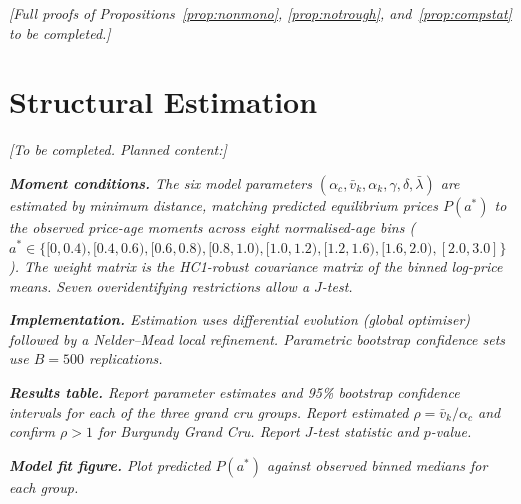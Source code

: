 \noindent\textit{[Full proofs of Propositions~\ref{prop:nonmono},
\ref{prop:notrough}, and~\ref{prop:compstat} to be completed.]}

\section{Structural Estimation}
\label{app:structural}

\noindent\textit{[To be completed. Planned content:]}

\noindent\textit{\textbf{Moment conditions.} The six model parameters
$(\alpha_{c}, \bar{v}_{k}, \alpha_{k}, \gamma, \delta, \bar{\lambda})$ are estimated by
minimum distance, matching predicted equilibrium prices $P(a^*)$ to the observed price-age
moments across eight normalised-age bins ($a^* \in \{[0,0.4), [0.4,0.6), [0.6,0.8),
[0.8,1.0), [1.0,1.2), [1.2,1.6), [1.6,2.0), [2.0,3.0]\}$). The weight matrix is the
HC1-robust covariance matrix of the binned log-price means. Seven overidentifying
restrictions allow a $J$-test.}

\noindent\textit{\textbf{Implementation.} Estimation uses differential evolution (global
optimiser) followed by a Nelder--Mead local refinement. Parametric bootstrap confidence
sets use $B = 500$ replications.}

\noindent\textit{\textbf{Results table.} Report parameter estimates and 95\% bootstrap
confidence intervals for each of the three grand cru groups. Report estimated $\rho =
\bar{v}_{k} / \alpha_{c}$ and confirm $\rho > 1$ for Burgundy Grand Cru.
Report $J$-test statistic and $p$-value.}

\noindent\textit{\textbf{Model fit figure.} Plot predicted $P(a^*)$ against observed binned
medians for each group.}
